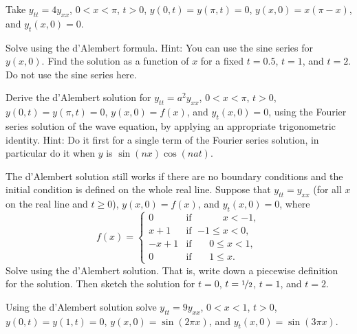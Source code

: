 \begin{exercise}
Take
$y_{tt} = 4y_{xx}$, $0 < x < \pi$, $t > 0$,
$y(0,t) = y(\pi, t) = 0$, $y(x,0) = x(\pi-x)$, and
$y_t(x,0) = 0$.
\begin{tasks}
\task Solve using the d'Alembert formula.  Hint: You can use the sine series
for $y(x,0)$.
\task Find the solution as a function of $x$ for a fixed $t=0.5$, $t=1$, and
$t=2$.  Do not use the sine series here.
\end{tasks}
\end{exercise}

\begin{exercise}
Derive the d'Alembert solution for $y_{tt} = a^2 y_{xx}$, $0 < x < \pi$, $t >
0$,
$y(0,t) = y(\pi, t) = 0$, $y(x,0) = f(x)$, and
$y_t(x,0) = 0$, using the Fourier series solution of the wave equation,
by applying an appropriate trigonometric identity.
Hint: Do it first for a single term of the Fourier series solution,
in particular do it when $y$ is
$\sin(n  x )\cos(n a t )$.
\end{exercise}

\begin{exercise}
The d'Alembert solution still works if there are no boundary conditions and
the initial condition is defined on the whole real line.  Suppose that
$y_{tt} = y_{xx}$ (for all $x$ on the real line and $t \geq 0$),
$y(x,0) = f(x)$, and
$y_t(x,0) = 0$, where
\begin{equation*}
f(x) =
\begin{cases}
0 & \text{if } \; \phantom{{-1} \leq {} }x < -1, \\
x+1 & \text{if } \; {-1} \leq x < 0, \\
-x+1 & \text{if } \; \phantom{-}0 \leq x < 1, \\
0 & \text{if } \; \phantom{-}1 \leq x .
\end{cases}
\end{equation*}
Solve using the d'Alembert solution. That is, write down a piecewise
definition for the solution.  Then sketch the solution for $t=0$,
$t=\nicefrac{1}{2}$, $t=1$, and $t=2$.
\end{exercise}

\setcounter{exercise}{100}

\begin{exercise}
Using the d'Alembert solution solve $y_{tt} = 9y_{xx}$, $0 < x < 1$, $t >
0$,
$y(0,t) = y(1, t) = 0$, $y(x,0) = \sin (2 \pi x)$, and
$y_t(x,0) = \sin (3 \pi x)$.
\end{exercise}

